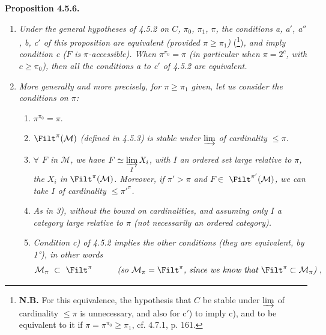 \textbf{Proposition 4.5.6.}
\begin{enumerate}[leftmargin=3em]
\item[\circled{1\textsuperscript{o}}] \textit{Under the general hypotheses of 4.5.2 on $C$, $\pi_0$, $\pi_1$, $\pi$, the conditions a, a$'$, a$''$, b, c$'$ of this proposition are equivalent (provided $\pi \geqslant \pi_1$)} (\footnote{\textbf{N.B.} For this equivalence, the hypothesis that $C$ be stable under $\varinjlim$ of cardinality $\leqslant \pi$ is unnecessary, and also for c$'$) to imply c), and to be equivalent to it if $\pi = \pi^{\pi_0} \geqslant \pi_1$, cf. 4.7.1, p. 161.})\textit{, and imply condition c ($F$ is $\pi$-accessible). When $\pi^{\pi_0} = \pi$ (in particular when $\pi = 2^{c}$, with $c \geqslant \pi_0$), then all the conditions a to c$'$ of 4.5.2 are equivalent.}
\item[\circled{2\textsuperscript{o}}] \textit{More generally and more precisely, for $\pi \geqslant \pi_1$ given, let us consider the conditions on $\pi$:}
\begin{enumerate}[leftmargin=2em]
\item[\textit{1)}] $\pi^{\pi_0} = \pi$.
\item[\textit{2)}] $\Filt^{\pi}(\mathcal{M})$ \textit{(defined in 4.5.3) is stable under $\varinjlim$ of cardinality $\leqslant \pi$.}
\item[\textit{3)}] \textit{$\forall$ $F$ in $\mathcal{M}$, we have $F \simeq \varinjlim\limits_{I} X_i$, with $I$ an ordered set large relative to $\pi$, the $X_i$ in} $\Filt^{\pi}(\mathcal{M})$\textit{. Moreover, if $\pi' > \pi$ and $F \in$} $\Filt^{\pi'}(\mathcal{M})$\textit{, we can take $I$ of cardinality $\leqslant \pi'^{\pi}$.}
\item[\textit{4)}] \textit{As in 3), without the bound on cardinalities, and assuming only $I$ a category large relative to $\pi$ (not necessarily an ordered category).} %
\item[\textit{5)}] \textit{Condition c) of 4.5.2 implies the other conditions (they are equivalent, by 1°), in other words}
\[
\mathcal{M}_{\pi} \ \subset\ \Filt^{\pi} \qquad\quad \textit{(so } \mathcal{M}_{\pi} = \Filt^{\pi}\textit{, since we know that } \Filt^{\pi} \subset \mathcal{M}_{\pi}\textit{)}\ ,
\]
\end{enumerate}
\end{enumerate}